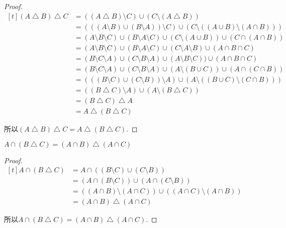 \begin{proof}
	$\begin{aligned}[t]
		(A\bigtriangleup B)\bigtriangleup C & =((A\bigtriangleup B)\setminus C)\cup (C\setminus (A\bigtriangleup B)) \\
		& =(((A\setminus B)\cup (B\setminus A))\setminus C)\cup (C\setminus ((A\cup B)\setminus (A\cap B))) \\
		& =(A\setminus B\setminus C)\cup (B\setminus A\setminus C)\cup (C\setminus (A\cup B))\cup (C\cap (A\cap B)) \\
		& =(A\setminus B\setminus C)\cup (B\setminus A\setminus C)\cup (C\setminus A\setminus B)\cup (A\cap B\cap C) \\
		& =(B\setminus C\setminus A)\cup (C\setminus B\setminus A)\cup (A\setminus B\setminus C))\cup (A\cap B\cap C) \\
		& =(B\setminus C\setminus A)\cup (C\setminus B\setminus A)\cup (A\setminus (B\cup C))\cup (A\cap (C\cap B)) \\
		& =(((B\setminus C)\cup (C\setminus B))\setminus A)\cup (A\setminus ((B\cup C)\setminus (C\cap B))) \\
		& =((B\bigtriangleup C)\setminus A)\cup (A\setminus (B\bigtriangleup C)) \\
		& =(B\bigtriangleup C)\bigtriangleup A \\
		& =A\bigtriangleup (B\bigtriangleup C)
	\end{aligned}$

	所以$(A\bigtriangleup B)\bigtriangleup C=A\bigtriangleup (B\bigtriangleup C)$.
\end{proof}

\begin{proposition}
	$A\cap (B\bigtriangleup C)=(A\cap B)\bigtriangleup (A\cap C)$
\end{proposition}

\begin{proof}
	$\begin{aligned}[t]
		A\cap (B\bigtriangleup C) & =A\cap ((B\setminus C)\cup (C\setminus B)) \\
		& =(A\cap (B\setminus C))\cup (A\cap (C\setminus B)) \\
		& =((A\cap B)\setminus (A\cap C))\cup ((A\cap C)\setminus (A\cap B)) \\
		& =(A\cap B)\bigtriangleup (A\cap C)
	\end{aligned}$

	所以$A\cap (B\bigtriangleup C)=(A\cap B)\bigtriangleup (A\cap C)$.
\end{proof}

